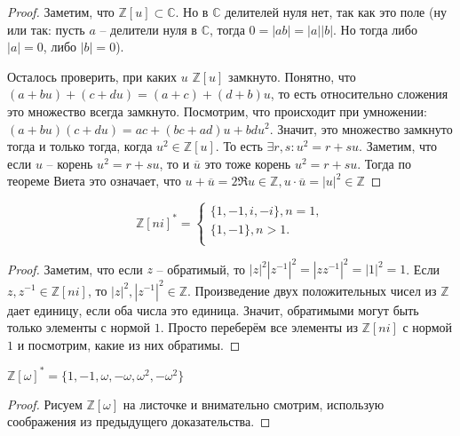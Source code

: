 \documentclass{article}
\begin{document}
\begin{proof}
    Заметим, что $\mathbb{Z}[u] \subset \mathbb{C}$. Но в $\mathbb{C}$ делителей нуля нет, так как это поле (ну или так:
    пусть $a$ -- делители нуля в $\mathbb{C}$, тогда $0 = |ab| = |a||b|$. Но тогда либо $|a| = 0$, либо $|b| = 0$).

    Осталось проверить, при каких $u$ $\mathbb{Z}[u]$ замкнуто. Понятно, что $(a + bu) + (c + du) = (a + c) + (d + b)u$,
    то есть относительно сложения это множество всегда замкнуто. Посмотрим, что происходит при умножении:
    $(a + bu)(c + du) = ac + (bc + ad)u + bd u^2$. Значит, это множество замкнуто тогда и только тогда, когда $u^2 \in
    \mathbb{Z}[u]$. То есть $\exists r, s: u^2 = r + su$. Заметим, что если $u$ -- корень $u^2 = r + su$, то и
    $\overline u$ это тоже корень $u^2 = r + su$. Тогда по теореме Виета это означает, что $u + \overline u = 2 \Re u \in
    \mathbb{Z}, u \cdot \overline u = |u|^2 \in \mathbb{Z}$
\end{proof}

\begin{statement}
    \[
        \mathbb{Z}[ni]^* =
        \begin{cases}
            \{1, -1, i, -i\}, n = 1, \\
            \{1, -1\}, n > 1. \\
        \end{cases}
    \]
\end{statement}

\begin{proof}
    Заметим, что если $z$ -- обратимый, то $|z|^2 |z^{-1}|^2 = |zz^{-1}|^2 = |1|^2 = 1$. Если $z, z^{-1} \in \mathbb{Z}[ni]$,
    то $|z|^2, |z^{-1}|^2 \in \mathbb{Z}$. Произведение двух положительных чисел из $\mathbb{Z}$ дает единицу, если оба
    числа это единица. Значит, обратимыми могут быть только элементы с нормой $1$. Просто переберём все элементы из
    $\mathbb{Z}[ni]$ с нормой $1$ и посмотрим, какие из них обратимы.
\end{proof}

\begin{statement}
    $\mathbb{Z}[\omega]^* = \{1, -1, \omega, -\omega, \omega^2, -\omega^2\}$
\end{statement}

\begin{proof}
    Рисуем $\mathbb{Z}[\omega]$ на листочке и внимательно смотрим, использую соображения из предыдущего доказательства.
\end{proof}
\end{document}

